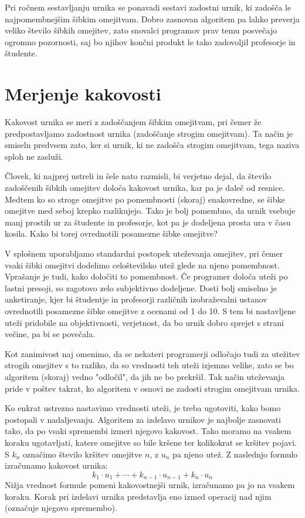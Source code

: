\documentclass[a4paper,10pt]{article}
\begin{document}
Pri ročnem sestavljanju urnika se ponavadi sestavi zadostni urnik, ki zadošča le
najpomembnejšim šibkim omejitvam. Dobro zasnovan algoritem pa lahko preverja veliko
število šibkih omejitev, zato snovalci programov prav temu posvečajo ogromno pozornosti,
saj bo njihov končni produkt le tako zadovoljil profesorje in študente.

\section{Merjenje kakovosti}

Kakovost urnika se meri z zadoščanjem šibkim omejitvam, pri čemer že predpostavljamo
zadostnost urnika (zadoščanje strogim omejitvam). Ta način je smiseln predvsem zato,
ker si urnik, ki ne zadošča strogim omejitvam, tega naziva sploh ne zasluži.

Človek, ki najprej ustreli in šele nato razmisli, bi verjetno dejal, da število
zadoščenih šibkih omejitev določa kakovost urnika, kar pa je daleč od resnice. Medtem
ko so stroge omejitve po pomembnosti (skoraj) enakovredne, se šibke omejitve med seboj
krepko razlikujejo. Tako je bolj pomembno, da urnik vsebuje manj prostih ur za
študente in profesorje, kot pa je dodeljena prosta ura v času kosila. Kako bi torej
ovrednotili posamezne šibke omejitve?

V splošnem uporabljamo standardni postopek uteževanja omejitev, pri čemer vsaki šibki
omejitvi dodelimo celoštevilsko utež glede na njeno pomembnost. Vprašanje je tudi, kako
določiti to pomembnost. Če programer določa uteži po lastni presoji, so zagotovo zelo
subjektivno dodeljene. Dosti bolj smiselno je anketiranje, kjer bi študentje in profesorji
različnih izobraževalni ustanov ovrednotili posamezne šibke omejitve z ocenami od 1 do 10.
S tem bi nastavljene uteži pridobile na objektivnosti, verjetnost, da bo urnik dobro
sprejet s strani večine, pa bi se povečala.

Kot zanimivost naj omenimo, da se nekateri programerji odločajo tudi za utežitev strogih
omejitev s to razliko, da so vrednosti teh uteži izjemno velike, zato se bo algoritem
(skoraj) vedno "odločil", da jih ne bo prekršil. Tak način uteževanja pride v poštev
takrat, ko algoritem v osnovi ne zadosti strogim omejitvam urnika.

Ko enkrat ustrezno nastavimo vrednosti uteži, je treba ugotoviti, kako bomo postopali
v nadaljevanju. Algoritem za izdelavo urnikov je najbolje zasnovati tako, da po vsaki
spremembi izmeri njegovo kakovost. Tako moramo na vsakem koraku ugotavljati, katere
omejitve so bile kršene ter kolikokrat se kršitev pojavi. S \(k_n\) označimo število
kršitev omejitve \(n\), z \(u_n\) pa njeno utež. Z naslednjo formulo izračunamo
kakovost urnika:
\[
k_1 \cdot u_1 + \cdots + k_{n-1} \cdot u_{n-1} + k_n \cdot u_n
\]
Nižja vrednost formule pomeni kakovostnejši urnik, izračunamo pa jo na vsakem koraku.
Korak pri izdelavi urnika predstavlja eno izmed operacij nad njim (označuje njegovo
spremembo).
\end{document}

